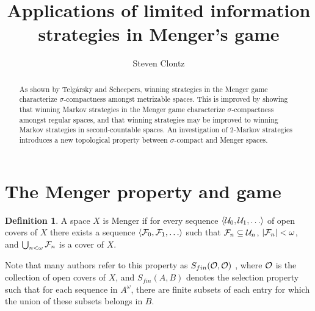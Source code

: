 \documentclass{amsart}
\theoremstyle{definition}
\newtheorem{definition}[theorem]{Definition}
\begin{document}
\title{Applications of limited information strategies in Menger's game}




\author{Steven Clontz}
\address{Department of Mathematics and Statistics, University of South Alabama,
Mobile, AL 36688}




\begin{abstract}
  As shown by Telg\'arsky and Scheepers,
  winning strategies in the Menger game characterize
  \(\sigma\)-compactness amongst metrizable spaces. This is improved
  by showing that winning Markov strategies in the Menger game
  characterize \(\sigma\)-compactness amongst
  regular spaces, and that winning strategies may be improved to winning
  Markov strategies in second-countable spaces.
  An investigation of
  \(2\)-Markov strategies introduces a new topological property between
  \(\sigma\)-compact and Menger spaces.
\end{abstract}


\maketitle

\section{The Menger property and game}

\begin{definition}
  A space \(X\) is Menger if for every sequence \(\<\mc U_0,\mc U_1,\dots\>\)
  of open covers of \(X\) there exists a sequence
  \(\<\mc F_0,\mc F_1,\dots\>\) such that \(\mathcal{F}_n\subseteq \mathcal{U}_n\),
  \(|\mathcal{F}_n|<\omega\), and \(\bigcup_{n<\omega}\mathcal{F}_n\) is a cover of \(X\).
\end{definition}

Note that many authors refer to this property as \(S_{fin}(\mathcal{O},\mathcal{O})\)
\cite{MR1378387},
where \(\mathcal{O}\) is the collection of open covers of \(X\), and
\(S_{fin}(A,B)\) denotes the selection property such that for each
sequence in \(A^\omega\), there are finite subsets of each entry for which
the union of these subsets belongs in \(B\).
\end{document}
